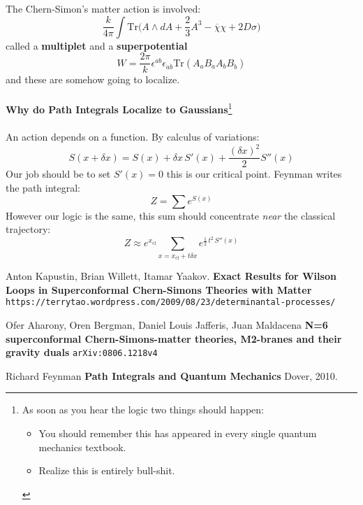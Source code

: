 \documentclass[12pt]{article}
\begin{document}
\noindent The Chern-Simon's matter action is involved:
$$ \frac{k}{4\pi} 
\int \text{Tr} \big( A \wedge dA + \frac{2}{3} A^3 - \overline{\chi}\chi + 2D \sigma \big) $$
called a \textbf{multiplet} and a \textbf{superpotential} 
$$W = \frac{2\pi}{k} \epsilon^{ab} \epsilon_{\dot{a}\dot{b}}
\text{Tr}
(A_a B_{\dot{a}}
A_b B_{\dot{b}}) $$
and these are somehow going to localize. \\ \\
\textbf{Why do Path Integrals Localize to Gaussians}\footnote{
As soon as you hear the logic two things should happen:
\begin{itemize}
\item You should remember this has appeared in every single quantum mechanics textbook.
\item Realize this is entirely bull-shit.
\end{itemize}}\\ \\
An action depends on a function.  By calculus of variations:
$$ S(x + \delta x) = S(x) + \delta x \, S'(x) + \frac{(\delta x)^2}{2} S''(x)$$
Our job should be to set $\boxed{S'(x) = 0}$ this is our critical point.  Feynman writes the path integral:
$$ Z = \sum e^{S(x)} $$
However our logic is the same, this sum should concentrate \textit{near} the classical trajectory:
$$ Z \approx e^{x_\text{cl}} \sum_{x = x_\text{cl} + t \delta x}  e^{ \frac{1}{2}\, t^2 \,S''(x)}$$
\newpage

\selectfont \fontsize{12}{10}\selectfont

\begin{thebibliography}{}


\item Anton Kapustin, Brian Willett, Itamar Yaakov.  \textbf{Exact Results for Wilson Loops in Superconformal Chern-Simons Theories with Matter } \\ \texttt{https://terrytao.wordpress.com/2009/08/23/determinantal-processes/}

\item Ofer Aharony, Oren Bergman, Daniel Louis Jafferis, Juan Maldacena \textbf{N=6 superconformal Chern-Simons-matter theories, M2-branes and their gravity duals}
\texttt{arXiv:0806.1218v4}

\item Richard Feynman \textbf{Path Integrals and Quantum Mechanics} Dover, 2010.


\end{thebibliography}
\end{document}
